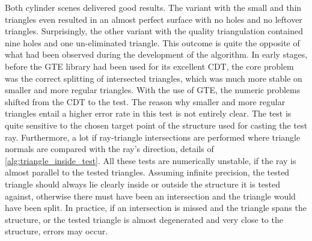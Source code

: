 Both cylinder scenes delivered good results.
The variant with the small and thin triangles even resulted in an almost perfect surface with no holes and no leftover triangles.
Surprisingly, the other variant with the quality triangulation contained nine holes and one un-eliminated triangle.
This outcome is quite the opposite of what had been observed during the development of the algorithm.
In early stages, before the GTE library had been used for its excellent CDT, the core problem was the correct splitting of intersected triangles, which was much more stable on smaller and more regular triangles.
With the use of GTE, the numeric problems shifted from the CDT to the  test.
The reason why smaller and more regular triangles entail a higher error rate in this test is not entirely clear.
The test is quite sensitive to the chosen target point of the structure used for casting the test ray.
Furthermore, a lot if ray-triangle intersections are performed where triangle normals are compared with the ray's direction, \cf details of \cref{alg:triangle_inside_test}.
All these tests are numerically unstable, if the ray is almost parallel to the tested triangles.
Assuming infinite precision, the tested triangle should always lie clearly inside or outside the structure it is tested against, otherwise there must have been an intersection and the triangle would have been split.
In practice, if an intersection is missed and the triangle spans the structure, or the tested triangle is almost degenerated and very close to the structure, errors may occur.

